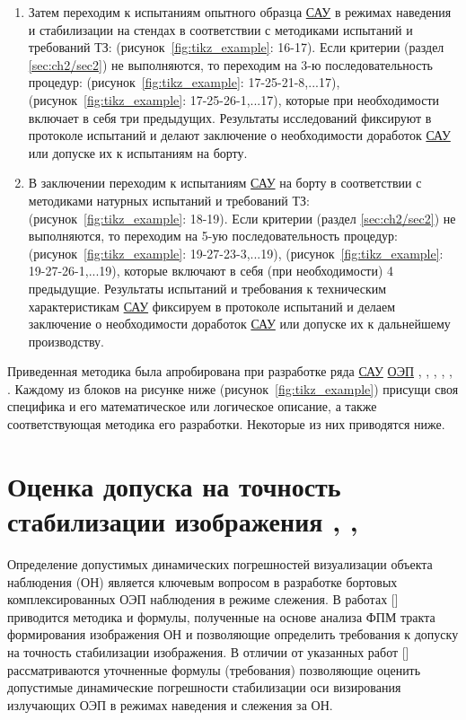 \begin{enumerate}
	\item Затем переходим к испытаниям опытного образца \hyperref[acroSAU]{САУ} в режимах наведения и стабилизации на стендах в соответствии с методиками испытаний и требований ТЗ: (рисунок~\ref{fig:tikz_example}: 16-17). Если критерии (раздел \ref{sec:ch2/sec2}) не выполняются, то переходим на 
	3-ю последовательность процедур: (рисунок~\ref{fig:tikz_example}: 17-25-21-8,...17), (рисунок~\ref{fig:tikz_example}: 17-25-26-1,...17), которые при необходимости включает в себя три предыдущих. Результаты исследований фиксируют в протоколе испытаний и делают заключение о необходимости доработок \hyperref[acroSAU]{САУ} или допуске их к испытаниям на борту. 
	
	\item В заключении переходим к испытаниям \hyperref[acroSAU]{САУ} на борту в соответствии с методиками натурных испытаний и требований ТЗ: (рисунок~\ref{fig:tikz_example}: 18-19). Если критерии (раздел \ref{sec:ch2/sec2}) не выполняются, то переходим на 5-ую последовательность процедур: (рисунок~\ref{fig:tikz_example}: 19-27-23-3,...19), (рисунок~\ref{fig:tikz_example}: 19-27-26-1,...19), которые включают в себя (при необходимости) 4 предыдущие. Результаты испытаний и требования к техническим характеристикам \hyperref[acroSAU]{САУ} фиксируем в протоколе испытаний и делаем заключение о необходимости доработок \hyperref[acroSAU]{САУ} или допуске их к дальнейшему производству.
	
\end{enumerate}

Приведенная методика была апробирована при разработке ряда \hyperref[acroSAU]{САУ} \hyperref[acroEOS]{ОЭП} \cite[]{Belyakov}, \cite[]{Karpov}, \cite[]{Baloev16}, \cite[]{Karpov17}, \cite[]{Gerasin19}, \cite[]{Molin21}. Каждому из блоков на рисунке ниже (рисунок~\ref{fig:tikz_example}) присущи своя специфика и его математическое или логическое описание, а также соответствующая методика его разработки. Некоторые из них приводятся ниже.

\newpage

\section{Оценка допуска на точность стабилизации изображения \cite[]{Belyakov}, \cite[]{Sokolski22}, \cite[]{Molin21} \label{sec:ch2/sec2}}  

Определение допустимых динамических погрешностей визуализации объекта наблюдения (ОН) является ключевым вопросом в разработке бортовых комплексированных ОЭП наблюдения в режиме слежения. В работах [] приводится методика и формулы, полученные на основе анализа ФПМ тракта формирования изображения ОН и позволяющие определить требования к допуску на точность стабилизации изображения. В отличии от указанных работ [] рассматриваются  уточненные формулы  (требования) позволяющие оценить допустимые динамические погрешности  стабилизации оси визирования излучающих ОЭП в режимах наведения и слежения за ОН.

